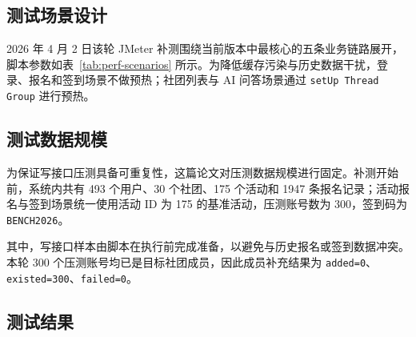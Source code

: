 \subsection{测试场景设计}

2026 年 4 月 2 日该轮 JMeter 补测围绕当前版本中最核心的五条业务链路展开，脚本参数如表~\ref{tab:perf-scenarios} 所示。为降低缓存污染与历史数据干扰，登录、报名和签到场景不做预热；社团列表与 AI 问答场景通过 \texttt{setUp Thread Group} 进行预热。

\begin{table}[H]
\centering
\small
\setlength{\tabcolsep}{4pt}
\caption{JMeter 测试场景与脚本参数}
\label{tab:perf-scenarios}
\end{table}

\subsection{测试数据规模}

为保证写接口压测具备可重复性，这篇论文对压测数据规模进行固定。补测开始前，系统内共有 493 个用户、30 个社团、175 个活动和 1947 条报名记录；活动报名与签到场景统一使用活动 ID 为 175 的基准活动，压测账号数为 300，签到码为 \texttt{BENCH2026}。

其中，写接口样本由脚本在执行前完成准备，以避免与历史报名或签到数据冲突。本轮 300 个压测账号均已是目标社团成员，因此成员补充结果为 \texttt{added=0}、\texttt{existed=300}、\texttt{failed=0}。

\subsection{测试结果}

